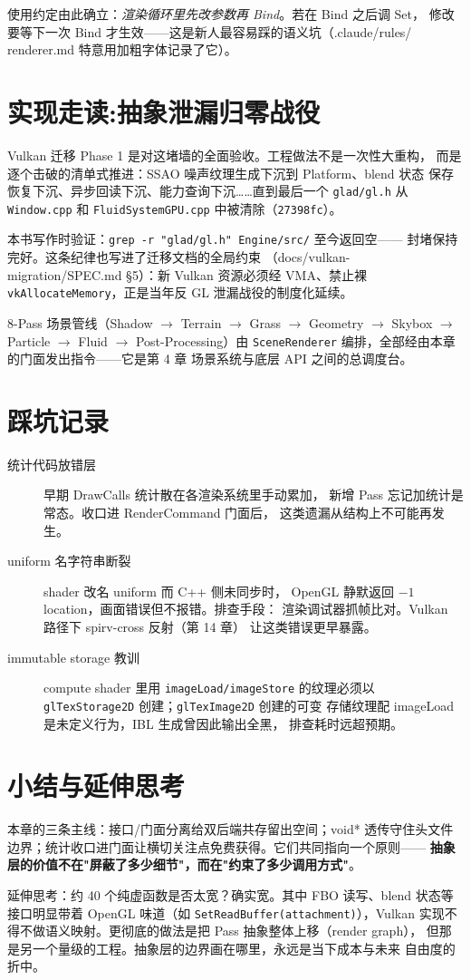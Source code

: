 使用约定由此确立：\emph{渲染循环里先改参数再 Bind}。若在 Bind 之后调 Set，
修改要等下一次 Bind 才生效——这是新人最容易踩的语义坑（.claude/rules/
renderer.md 特意用加粗字体记录了它）。

\section{实现走读:抽象泄漏归零战役}

Vulkan 迁移 Phase 1 是对这堵墙的全面验收。工程做法不是一次性大重构，
而是逐个击破的清单式推进：SSAO 噪声纹理生成下沉到 Platform、blend 状态
保存恢复下沉、异步回读下沉、能力查询下沉……直到最后一个
\texttt{glad/gl.h} 从 \texttt{Window.cpp} 和 \texttt{FluidSystemGPU.cpp}
中被清除（\texttt{27398fc}）。

本书写作时验证：\texttt{grep -r "glad/gl.h" Engine/src/} 至今返回空——
封堵保持完好。这条纪律也写进了迁移文档的全局约束
（docs/vulkan-migration/SPEC.md §5）：新 Vulkan 资源必须经 VMA、禁止裸
\texttt{vkAllocateMemory}，正是当年反 GL 泄漏战役的制度化延续。

8-Pass 场景管线（Shadow $\to$ Terrain $\to$ Grass $\to$ Geometry $\to$
Skybox $\to$ Particle $\to$ Fluid $\to$ Post-Processing）由
\texttt{SceneRenderer} 编排，全部经由本章的门面发出指令——它是第 4 章
场景系统与底层 API 之间的总调度台。

\section{踩坑记录}

\begin{description}
  \item[统计代码放错层] 早期 DrawCalls 统计散在各渲染系统里手动累加，
        新增 Pass 忘记加统计是常态。收口进 RenderCommand 门面后，
        这类遗漏从结构上不可能再发生。
  \item[uniform 名字符串断裂] shader 改名 uniform 而 C++ 侧未同步时，
        OpenGL 静默返回 $-1$ location，画面错误但不报错。排查手段：
        渲染调试器抓帧比对。Vulkan 路径下 spirv-cross 反射（第 14 章）
        让这类错误更早暴露。
  \item[immutable storage 教训] compute shader 里用
        \texttt{imageLoad/imageStore} 的纹理必须以
        \texttt{glTexStorage2D} 创建；\texttt{glTexImage2D} 创建的可变
        存储纹理配 imageLoad 是未定义行为，IBL 生成曾因此输出全黑，
        排查耗时远超预期。
\end{description}

\section{小结与延伸思考}

本章的三条主线：接口/门面分离给双后端共存留出空间；void* 透传守住头文件
边界；统计收口进门面让横切关注点免费获得。它们共同指向一个原则——
\textbf{抽象层的价值不在"屏蔽了多少细节"，而在"约束了多少调用方式"}。

延伸思考：约 40 个纯虚函数是否太宽？确实宽。其中 FBO 读写、blend 状态等
接口明显带着 OpenGL 味道（如 \texttt{SetReadBuffer(attachment)}），Vulkan
实现不得不做语义映射。更彻底的做法是把 Pass 抽象整体上移（render graph），
但那是另一个量级的工程。抽象层的边界画在哪里，永远是当下成本与未来
自由度的折中。
